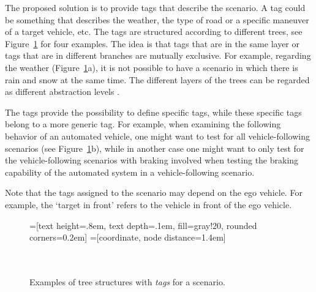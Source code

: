 The proposed solution is to provide tags that describe the scenario. A tag could be something that describes the weather, the type of road or a specific maneuver of a target vehicle, etc. The tags are structured according to different trees, see Figure~\ref{fig:tag trees} for four examples. The idea is that tags that are in the same layer or tags that are in different branches are mutually exclusive. For example, regarding the weather (Figure~\ref{fig:tag trees}a), it is not possible to have a scenario in which there is rain and snow at the same time. The different layers of the trees can be regarded as different abstraction levels \cite{Bonnin2014}. 

The tags provide the possibility to define specific tags, while these specific tags belong to a more generic tag. For example, when examining the following behavior of an automated vehicle, one might want to test for all vehicle-following scenarios (see Figure~\ref{fig:tag trees}b), while in another case one might want to only test for the vehicle-following scenarios with braking involved when testing the braking capability of the automated system in a vehicle-following scenario.

Note that the tags assigned to the scenario may depend on the ego vehicle. For example, the `target in front' refers to the vehicle in front of the ego vehicle.

\begin{figure}
	\begin{center}
		=[text height=.8em, text depth=.1em, fill=gray!20, rounded corners=0.2em]
		=[coordinate, node distance=1.4em]
		 \\
		\\
		 \\
		\caption{Examples of tree structures with \emph{tags} for a scenario.}
		\label{fig:tag trees}
	\end{center}
\end{figure}
